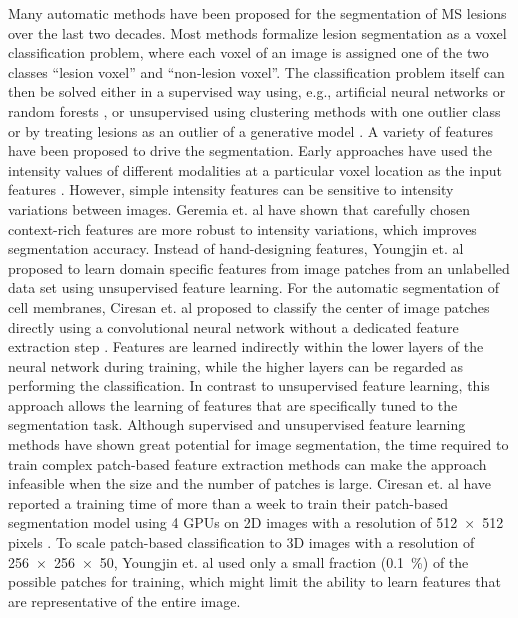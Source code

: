 Many automatic methods have been proposed for the segmentation of MS lesions
over the last two decades. Most methods formalize lesion segmentation as a voxel
classification problem, where each voxel of an image is assigned one of the two
classes ``lesion voxel'' and ``non-lesion voxel''. The classification problem
itself can then be solved either in a supervised way using, e.g., artificial
neural networks \cite{zijdenbos1994} or random forests \cite{geremia2010}, or
unsupervised using clustering methods with one outlier class \cite{souplet2008}
or by treating lesions as an outlier of a generative model \cite{weiss2013}. A
variety of features have been proposed to drive the segmentation. Early
approaches have used the intensity values of different modalities at a
particular voxel location as the input features \cite{zijdenbos1994}. However,
simple intensity features can be sensitive to intensity variations between
images. Geremia et. al \cite{geremia2010} have shown that carefully chosen
context-rich features are more robust to intensity variations, which improves
segmentation accuracy. Instead of hand-designing features, Youngjin et. al
\cite{yoo2014} proposed to learn domain specific features from image patches
from an unlabelled data set using unsupervised feature learning. For the
automatic segmentation of cell membranes, Ciresan et. al proposed to classify
the center of image patches directly using a convolutional neural network
without a dedicated feature extraction step \cite{Ciresan2012}. Features are
learned indirectly within the lower layers of the neural network during
training, while the higher layers can be regarded as performing the
classification. In contrast to unsupervised feature learning, this approach
allows the learning of features that are specifically tuned to the segmentation
task. Although supervised and unsupervised feature learning methods have shown
great potential for image segmentation, the time required to train complex
patch-based feature extraction methods can make the approach infeasible when the
size and the number of patches is large. Ciresan et. al have reported a training
time of more than a week to train their patch-based segmentation model using 4
GPUs on 2D images with a resolution of \num{512x512} pixels
\cite{Ciresan2012}. To scale patch-based classification to 3D images with a
resolution of \num{256x256x50}, Youngjin et. al used only a small fraction
(\SI{0.1}{\percent}) of the possible patches for training, which might limit the
ability to learn features that are representative of the entire image.

